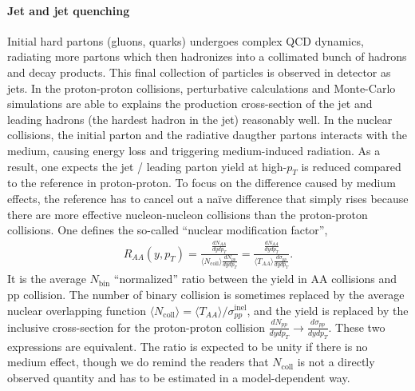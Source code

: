\paragraph{Jet and jet quenching}
Initial hard partons (gluons, quarks) undergoes complex QCD dynamics, radiating more partons which then hadronizes into a collimated bunch of hadrons and decay products.
This final collection of particles is observed in detector as jets.
In the proton-proton collisions, perturbative calculations and Monte-Carlo simulations are able to explains the production cross-section of the jet and leading hadrons (the hardest hadron in the jet) reasonably well.
In the nuclear collisions, the initial parton and the radiative daugther partons interacts with the medium, causing energy loss and triggering medium-induced radiation.
As a result, one expects the jet / leading parton yield at high-$p_T$ is reduced compared to the reference in proton-proton.
To focus on the difference caused by medium effects, the reference has to cancel out a na\"ive difference that simply rises because there are more effective nucleon-nucleon collisions than the proton-proton collisions.
One defines the so-called ``nuclear modification factor'',
\begin{eqnarray}
R_{AA}(y, p_T) = \frac{\frac{dN_{AA}}{dy dp_T}}{\langle N_{\textrm{coll}}\rangle \frac{dN_{pp}}{dy dp_T}} = \frac{\frac{dN_{AA}}{dy dp_T}}{\langle T_{AA} \rangle \frac{d\sigma_{pp}}{dy dp_T}}.
\end{eqnarray}
It is the average $N_{\textrm{bin}}$ ``normalized'' ratio between the yield in AA collisions and pp collision.
The number of binary collision is sometimes replaced by the average nuclear overlapping function $\langle N_{\textrm{coll}}\rangle = \langle T_{AA} \rangle /\sigma_{pp}^{\textrm{inel}}$, and the yield is replaced by the inclusive cross-section for the proton-proton collision $\frac{dN_{pp}}{dy dp_T}\rightarrow \frac{d\sigma_{pp}}{dy dp_T}$.
These two expressions are equivalent.
The ratio is expected to be unity if there is no medium effect, though we do remind the readers that $N_{\textrm{coll}}$ is not a directly observed quantity and has to be estimated in a model-dependent way.

